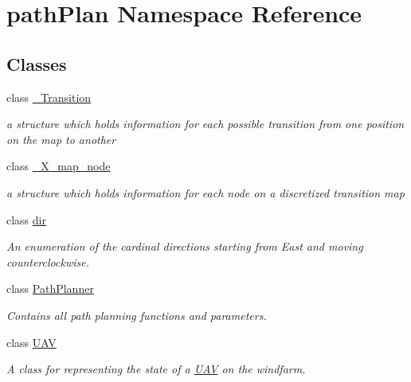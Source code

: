 \hypertarget{namespacepath_plan}{}\section{path\+Plan Namespace Reference}
\label{namespacepath_plan}
\subsection*{Classes}
\begin{DoxyCompactItemize}
\item 
class \mbox{\hyperlink{classpath_plan_1_1___transition}{\+\_\+\+Transition}}
\begin{DoxyCompactList}\small\item\em a structure which holds information for each possible transition from one position on the map to another \end{DoxyCompactList}\item 
class \mbox{\hyperlink{classpath_plan_1_1___x__map__node}{\+\_\+\+X\+\_\+map\+\_\+node}}
\begin{DoxyCompactList}\small\item\em a structure which holds information for each node on a discretized transition map \end{DoxyCompactList}\item 
class \mbox{\hyperlink{classpath_plan_1_1dir}{dir}}
\begin{DoxyCompactList}\small\item\em An enumeration of the cardinal directions starting from East and moving counterclockwise. \end{DoxyCompactList}\item 
class \mbox{\hyperlink{classpath_plan_1_1_path_planner}{Path\+Planner}}
\begin{DoxyCompactList}\small\item\em Contains all path planning functions and parameters. \end{DoxyCompactList}\item 
class \mbox{\hyperlink{classpath_plan_1_1_u_a_v}{U\+AV}}
\begin{DoxyCompactList}\small\item\em A class for representing the state of a \mbox{\hyperlink{classpath_plan_1_1_u_a_v}{U\+AV}} on the windfarm. \end{DoxyCompactList}\end{DoxyCompactItemize}
